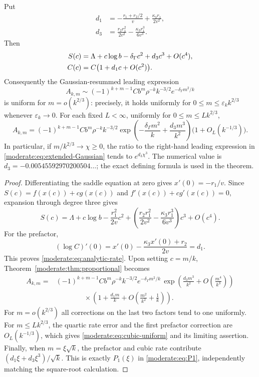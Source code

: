 \begin{corollary}
\label{moderate:cor:cubic-transition}
Put
\begin{align*}
 d_1&=-\frac{r_1+r_2/2}{v}+\frac{\kappa_3r_1}{2v^2},\\
 d_3&=\frac{r_2r_1^2}{2v^2}-\frac{\kappa_3r_1^3}{6v^3}.
\end{align*}
Then
\begin{align}\label{moderate:eq:analytic-rate}
 S(c)&=\Lambda+c\log b-\delta_\Gamma c^2+d_3c^3+O(c^4),\notag\\
 C(c)&=C\bigl(1+d_1c+O(c^2)\bigr).
\end{align}
Consequently the Gaussian-resummed leading expression
\begin{equation}\label{moderate:eq:extended-Gaussian}
 A_{k,m}\sim(-1)^{k+m-1}Cb^m\rho^{-k}k^{-3/2}
                     e^{-\delta_\Gamma m^2/k}
\end{equation}
is uniform for $m=o(k^{2/3})$: precisely, it holds uniformly for
$0\le m\le\varepsilon_k k^{2/3}$ whenever $\varepsilon_k\to0$.
For each fixed $L<\infty$, uniformly for $0\le m\le Lk^{2/3}$,
\begin{equation}\label{moderate:eq:cubic-uniform}
 A_{k,m}=(-1)^{k+m-1}Cb^m\rho^{-k}k^{-3/2}
  \exp\left(-\frac{\delta_\Gamma m^2}{k}
               +\frac{d_3m^3}{k^2}\right)
           \bigl(1+O_L(k^{-1/3})\bigr).
\end{equation}
In particular, if $m/k^{2/3}\to\chi\ge0$, the ratio to the right-hand
leading expression in \eqref{moderate:eq:extended-Gaussian} tends to
$e^{d_3\chi^3}$. The numerical value is
$d_3=-0.00545592970200504\ldots$; the exact defining formula is used
in the theorem.
\end{corollary}

\begin{proof}
Differentiating the saddle equation at zero gives
$x'(0)=-r_1/v$. Since $S(c)=f(x(c))+cg(x(c))$ and
$f'(x(c))+cg'(x(c))=0$, expansion through degree three gives
\[
 S(c)=\Lambda+c\log b-\frac{r_1^2}{2v}c^2+
       \left(\frac{r_2r_1^2}{2v^2}
             -\frac{\kappa_3r_1^3}{6v^3}\right)c^3+O(c^4).
\]
For the prefactor,
\[
 (\log C)'(0)=x'(0)-\frac{\kappa_3x'(0)+r_2}{2v}=d_1.
\]
This proves \eqref{moderate:eq:analytic-rate}. Upon setting $c=m/k$,
Theorem~\ref{moderate:thm:proportional} becomes
\begin{align*}
 A_{k,m}={}&(-1)^{k+m-1}Cb^m\rho^{-k}k^{-3/2}
 e^{-\delta_\Gamma m^2/k}\,
 \exp\left(\frac{d_3m^3}{k^2}+O\left(\frac{m^4}{k^3}\right)\right)\\
 &\hspace{4em}\times\left(1+\frac{d_1m}{k}
                  +O\left(\frac{m^2}{k^2}+\frac1k\right)\right).
\end{align*}
For $m=o(k^{2/3})$ all corrections on the last two factors tend to
one uniformly. For $m\le Lk^{2/3}$, the quartic rate error and the
first prefactor correction are $O_L(k^{-1/3})$, which gives
\eqref{moderate:eq:cubic-uniform} and its limiting assertion.
Finally, when $m=\xi\sqrt k$, the prefactor and cubic rate contribute
$(d_1\xi+d_3\xi^3)/\sqrt k$. This is exactly $P_1(\xi)$ in
\eqref{moderate:eq:P1}, independently matching the square-root
calculation.
\end{proof}

